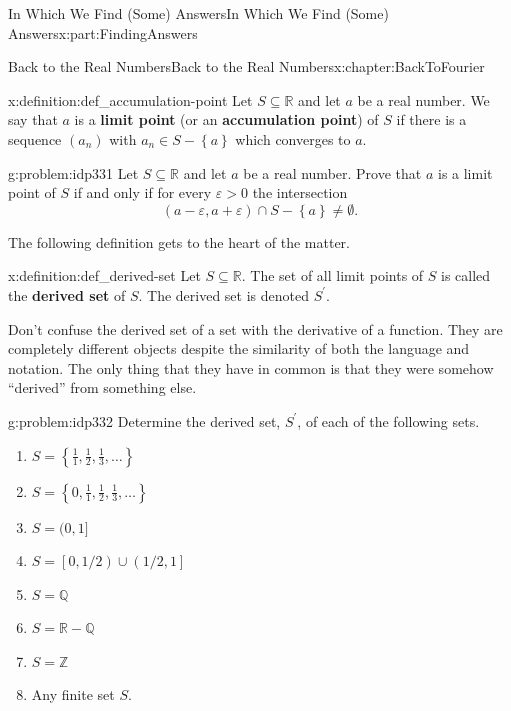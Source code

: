 \documentclass[oneside,10pt,]{book}
\newcommand{\terminology}[1]{\textbf{#1}}
\numberwithin{equation}{section}
\newcommand{\eps}{\varepsilon}
\newcommand{\RR}{\mathbb {R}}
\newcommand{\QQ}{\mathbb {Q}}
\newcommand{\ZZ}{\mathbb {Z}}
\begin{document}
\begin{partptx}{In Which We Find (Some) Answers}{}{In Which We Find (Some) Answers}{}{}{x:part:FindingAnswers}
\begin{chapterptx}{Back to the Real Numbers}{}{Back to the Real Numbers}{}{}{x:chapter:BackToFourier}
\begin{introduction}{}
\begin{definition}{}{x:definition:def_accumulation-point}%
 Let \(S\subseteq \RR\) and let \(a\) be a real number. We say that \(a\) is a \terminology{limit point} (or an \terminology{accumulation point}) of \(S\) if there is a sequence \((a_n)\) with \(a_n\in S-\left\{a\right\}\) which converges to \(a\).%
\end{definition}
\begin{problem}{}{g:problem:idp331}%
 Let \(S\subseteq\RR\) and let \(a\) be a real number. Prove that \(a\) is a limit point of \(S\) if and only if for every \(\eps>0\) the intersection%
\begin{equation*}
(a-\eps, a+\eps) \cap S-\left\{a\right\} \neq \emptyset.{}
\end{equation*}
%
\end{problem}
The following definition gets to the heart of the matter.%
\begin{definition}{}{x:definition:def_derived-set}%
 Let \(S\subseteq\RR\). The set of all limit points of \(S\) is called the \terminology{derived set} of \(S\). The derived set is denoted \(S^{\prime}\).%
\end{definition}
Don't confuse the derived set of a set with the derivative of a function. They are completely different objects despite the similarity of both the language and notation. The only thing that they have in common is that they were somehow ``derived'' from something else.%
\begin{problem}{}{g:problem:idp332}%
Determine the derived set, \(S^\prime\), of each of the following sets.%
\begin{enumerate}[label=(\alph*)]
\item{}\(\displaystyle S=\left\{\frac11, \frac12, \frac13, \ldots\right\}\)%
\item{}\(\displaystyle S=\left\{0,\frac11, \frac12, \frac13, \ldots\right\}\)%
\item{}\(\displaystyle S=(0,1]\)%
\item{}\(\displaystyle S=\left[\left.0,1/2\right)\right.\cup\left.\left(1/2,1\right.\right]\)%
\item{}\(\displaystyle S=\QQ\)%
\item{}\(\displaystyle S=\RR-\QQ\)%
\item{}\(\displaystyle S=\ZZ\)%
\item{}Any finite set \(S\).%

\end{enumerate}
\end{problem}
\end{introduction}
\end{chapterptx}
\end{partptx}
\end{document}
